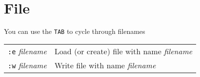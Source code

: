 \section{File}
You can use the \texttt{TAB} to cycle through filenames
\begin{tabular}{@{}p{\the\MyLen}%
				@{}p{\linewidth-\the\MyLen}}
\verb!:e! \textit{filename} & Load (or create) file with name \textit{filename}\\
\verb!:w! \textit{filename} & Write file with name \textit{filename}\\
\end{tabular}
